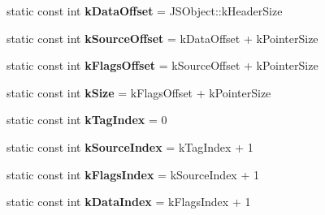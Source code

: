 \begin{DoxyCompactItemize}
\item 
static const int {\bfseries k\+Data\+Offset} = J\+S\+Object\+::k\+Header\+Size\hypertarget{classv8_1_1internal_1_1_j_s_reg_exp_a7fb0f9c5fbcb09431c8d2eb6a24754f8}{}\label{classv8_1_1internal_1_1_j_s_reg_exp_a7fb0f9c5fbcb09431c8d2eb6a24754f8}

\item 
static const int {\bfseries k\+Source\+Offset} = k\+Data\+Offset + k\+Pointer\+Size\hypertarget{classv8_1_1internal_1_1_j_s_reg_exp_a4fec5ac83bf21a1fbb1b354d92dede31}{}\label{classv8_1_1internal_1_1_j_s_reg_exp_a4fec5ac83bf21a1fbb1b354d92dede31}

\item 
static const int {\bfseries k\+Flags\+Offset} = k\+Source\+Offset + k\+Pointer\+Size\hypertarget{classv8_1_1internal_1_1_j_s_reg_exp_a478a57625c3c0beffe90a13405df095e}{}\label{classv8_1_1internal_1_1_j_s_reg_exp_a478a57625c3c0beffe90a13405df095e}

\item 
static const int {\bfseries k\+Size} = k\+Flags\+Offset + k\+Pointer\+Size\hypertarget{classv8_1_1internal_1_1_j_s_reg_exp_a90b7c792009e3057465b57d833b24953}{}\label{classv8_1_1internal_1_1_j_s_reg_exp_a90b7c792009e3057465b57d833b24953}

\item 
static const int {\bfseries k\+Tag\+Index} = 0\hypertarget{classv8_1_1internal_1_1_j_s_reg_exp_a6b776416f183835b0c80536fb03d8c50}{}\label{classv8_1_1internal_1_1_j_s_reg_exp_a6b776416f183835b0c80536fb03d8c50}

\item 
static const int {\bfseries k\+Source\+Index} = k\+Tag\+Index + 1\hypertarget{classv8_1_1internal_1_1_j_s_reg_exp_a8829823bf0846b7e0e35f177a7073965}{}\label{classv8_1_1internal_1_1_j_s_reg_exp_a8829823bf0846b7e0e35f177a7073965}

\item 
static const int {\bfseries k\+Flags\+Index} = k\+Source\+Index + 1\hypertarget{classv8_1_1internal_1_1_j_s_reg_exp_a516810e52b83b427e6cce8933e9e0572}{}\label{classv8_1_1internal_1_1_j_s_reg_exp_a516810e52b83b427e6cce8933e9e0572}

\item 
static const int {\bfseries k\+Data\+Index} = k\+Flags\+Index + 1\hypertarget{classv8_1_1internal_1_1_j_s_reg_exp_af16b2b10a9e6f1923103fe6bd46c48de}{}\label{classv8_1_1internal_1_1_j_s_reg_exp_af16b2b10a9e6f1923103fe6bd46c48de}


\end{DoxyCompactItemize}
